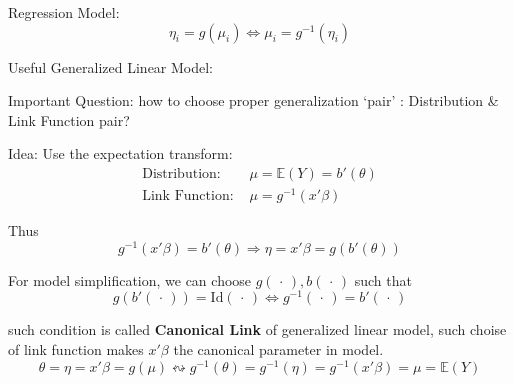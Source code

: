    Regression Model:
    \begin{equation}
        \eta_i=g(\mu_i)\Leftrightarrow \mu _i=g^{-1}(\eta_i) 
    \end{equation}

\begin{point}
    Useful Generalized Linear Model:
\end{point}

    Important Question: how to choose proper generalization `pair' : Distribution \& Link Function pair?

    Idea: Use the expectation transform:
\begin{align*}
    \text{Distribution: }&\mu =\mathbb{E}(Y)=b'(\theta )\\
    \text{Link Function: }& \mu=g^{-1}(x'\beta ) 
\end{align*}
    
    Thus 
    \begin{equation}
        g^{-1}(x'\beta )=b'(\theta )\Rightarrow  \eta=x'\beta = g(b'(\theta ))
    \end{equation}
    
    For model simplification, we can choose $ g(\,\cdot\,), b(\,\cdot\,) $ such that 
\begin{equation}\label{EqaGLMModelFunctionSelection}
    g(b'(\,\cdot\,))=\mathrm{Id}(\,\cdot\,)\Leftrightarrow g^{-1}(\,\cdot\,)=b'(\,\cdot\,)    
\end{equation}

    such condition is called \textbf{Canonical Link} of generalized linear model, such choise of link function makes $ x'\beta  $ the canonical parameter in model.
    \begin{equation}
        \theta=\eta=x'\beta =g(\mu )\leftrightsquigarrow g^{-1}(\theta )=g^{-1}(\eta)=g^{-1}(x'\beta )=\mu =\mathbb{E}(Y)
    \end{equation}
    
    
    
    
    
    


